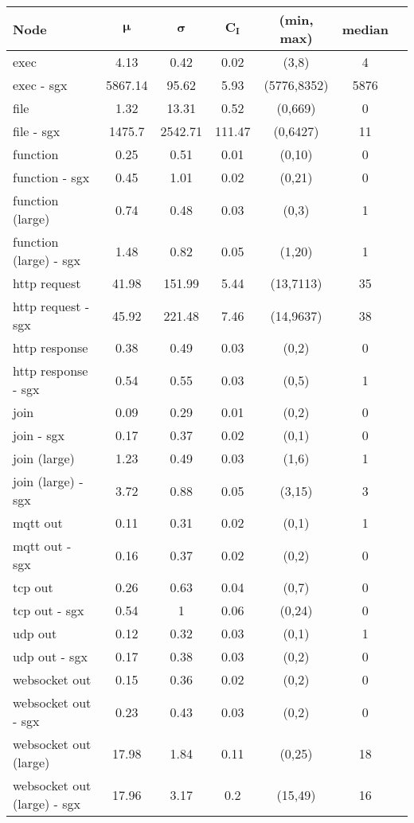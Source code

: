 \begin{tabular}{|p{}|c|c|c|c|c|c|}
\hline
\textbf{Node} & $\pmb{\mu}$ & $\pmb{\sigma}$ & $\pmb{C_I}$ &\textbf{(min, max)} & \textbf{median}\\ \hline \hline 
exec & 4.13 & 0.42 & 0.02 &(3,8) & 4 \\ \hline 
exec - sgx & 5867.14 & 95.62 & 5.93 &(5776,8352) & 5876 \\ \hline 
\hline
file & 1.32 & 13.31 & 0.52 &(0,669) & 0 \\ \hline 
file - sgx & 1475.7 & 2542.71 & 111.47 &(0,6427) & 11 \\ \hline 
\hline
function & 0.25 & 0.51 & 0.01 &(0,10) & 0 \\ \hline 
function - sgx & 0.45 & 1.01 & 0.02 &(0,21) & 0 \\ \hline 
\hline
function (large) & 0.74 & 0.48 & 0.03 &(0,3) & 1 \\ \hline 
function (large) - sgx & 1.48 & 0.82 & 0.05 &(1,20) & 1 \\ \hline 
\hline
http request & 41.98 & 151.99 & 5.44 &(13,7113) & 35 \\ \hline 
http request - sgx & 45.92 & 221.48 & 7.46 &(14,9637) & 38 \\ \hline 
\hline
http response & 0.38 & 0.49 & 0.03 &(0,2) & 0 \\ \hline 
http response - sgx & 0.54 & 0.55 & 0.03 &(0,5) & 1 \\ \hline 
\hline
join & 0.09 & 0.29 & 0.01 &(0,2) & 0 \\ \hline 
join - sgx & 0.17 & 0.37 & 0.02 &(0,1) & 0 \\ \hline 
\hline
join (large) & 1.23 & 0.49 & 0.03 &(1,6) & 1 \\ \hline 
join (large) - sgx & 3.72 & 0.88 & 0.05 &(3,15) & 3 \\ \hline 
\hline
mqtt out & 0.11 & 0.31 & 0.02 &(0,1) & 1 \\ \hline 
mqtt out - sgx & 0.16 & 0.37 & 0.02 &(0,2) & 0 \\ \hline 
\hline
tcp out & 0.26 & 0.63 & 0.04 &(0,7) & 0 \\ \hline 
tcp out - sgx & 0.54 & 1 & 0.06 &(0,24) & 0 \\ \hline 
\hline
udp out & 0.12 & 0.32 & 0.03 &(0,1) & 1 \\ \hline 
udp out - sgx & 0.17 & 0.38 & 0.03 &(0,2) & 0 \\ \hline 
\hline
websocket out & 0.15 & 0.36 & 0.02 &(0,2) & 0 \\ \hline 
websocket out - sgx & 0.23 & 0.43 & 0.03 &(0,2) & 0 \\ \hline 
\hline
websocket out (large) & 17.98 & 1.84 & 0.11 &(0,25) & 18 \\ \hline 
websocket out (large) - sgx & 17.96 & 3.17 & 0.2 &(15,49) & 16 \\ \hline 
\hline
\end{tabular}
